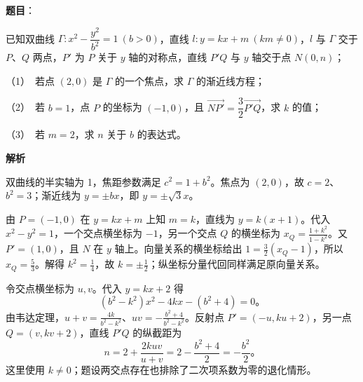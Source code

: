 \begin{answer}

\textbf{题目}：

已知双曲线 $\Gamma:x^2-\dfrac{y^2}{b^2}=1\ (b>0)$，直线 $l:y=kx+m\ (km\ne0)$，$l$ 与 $\Gamma$ 交于 $P\text{、}Q$ 两点，$P'$ 为 $P$ 关于 $y$ 轴的对称点，直线 $P'Q$ 与 $y$ 轴交于点 $N(0,n)$；

（1）　若点 $(2,0)$ 是 $\Gamma$ 的一个焦点，求 $\Gamma$ 的渐近线方程；

（2）　若 $b=1$，点 $P$ 的坐标为 $(-1,0)$，且 $\overrightarrow{NP'}=\dfrac32\overrightarrow{P'Q}$，求 $k$ 的值；

（3）　若 $m=2$，求 $n$ 关于 $b$ 的表达式。

\textbf{解析}


双曲线的半实轴为 1，焦距参数满足 $c^2=1+b^2$。焦点为 $(2,0)$，故 $c=2$、$b^2=3$；渐近线为 $y=\pm bx$，即 $y=\pm\sqrt3x$。


由 $P=(-1,0)$ 在 $y=kx+m$ 上知 $m=k$，直线为 $y=k(x+1)$。代入 $x^2-y^2=1$，一个交点横坐标为 $-1$，另一个交点 $Q$ 的横坐标为 $x_Q=\frac{1+k^2}{1-k^2}$。又 $P'=(1,0)$，且 $N$ 在 $y$ 轴上。向量关系的横坐标给出 $1=\frac32(x_Q-1)$，所以 $x_Q=\frac53$。解得 $k^2=\frac14$，故 $k=\pm\frac12$；纵坐标分量代回同样满足原向量关系。


令交点横坐标为 $u,v$。代入 $y=kx+2$ 得
\nopagebreak[4]
\[
(b^2-k^2)x^2-4kx-(b^2+4)=0\text{。}
\]
由韦达定理，$u+v=\frac{4k}{b^2-k^2}$、$uv=-\frac{b^2+4}{b^2-k^2}$。反射点 $P'=(-u,ku+2)$，另一点 $Q=(v,kv+2)$，直线 $P'Q$ 的纵截距为
\nopagebreak[4]
\[
n=2+\frac{2kuv}{u+v}
=2-\frac{b^2+4}{2}
=-\frac{b^2}{2}\text{。}
\]
这里使用 $k\ne0$；题设两交点存在也排除了二次项系数为零的退化情形。




\end{answer}
